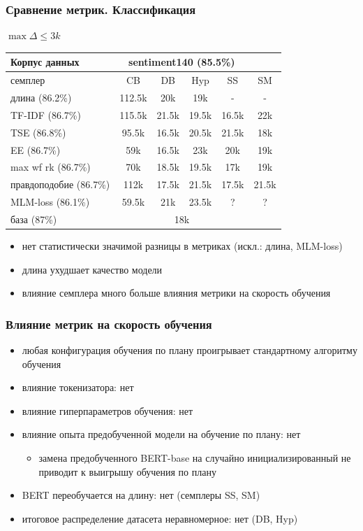 \documentclass{beamer}
\begin{document}
\begin{frame}
	\frametitle{Сравнение метрик. Классификация}
	$\max\Delta \le 3k$
	\begin{table}
		\begin{tabular}{l|ccccc}
			Корпус данных & \multicolumn{4}{c}{sentiment140 (85.5\%)}\\
			\hline
			семплер & CB & DB & Hyp & SS & SM\\
			\hline
			длина (86.2\%) & 112.5k & 20k & 19k & - & -\\
			TF-IDF (86.7\%) & 115.5k & 21.5k & 19.5k & 16.5k & 22k\\
			TSE (86.8\%) & 95.5k & 16.5k & 20.5k & 21.5k & 18k\\
			EE (86.7\%) & 59k & 16.5k & 23k & 20k & 19k\\
			max wf rk (86.7\%) & 70k & 18.5k & 19.5k & 17k & 19k\\
			правдоподобие (86.7\%) & 112k & 17.5k & 21.5k & 17.5k & 21.5k\\
			MLM-loss (86.1\%) & 59.5k & 21k & 23.5k & ? & ?\\
			\hline
			база (87\%) & \multicolumn{4}{c}{18k}
		\end{tabular}
	\end{table}
	\begin{itemize}
		\item нет статистически значимой разницы в метриках (искл.: длина, MLM-loss)
		\item длина ухудшает качество модели
		\item влияние семплера много больше влияния метрики на скорость обучения
	\end{itemize}
\end{frame}

\begin{frame}
	\frametitle{Влияние метрик на скорость обучения}
	\begin{itemize}
		\item любая конфигурация обучения по плану проигрывает стандартному алгоритму обучения
		\item влияние токенизатора: нет
		\item влияние гиперпараметров обучения: нет
		\item влияние опыта предобученной модели на обучение по плану: нет
		\begin{itemize}
			\item замена предобученного BERT-base на случайно инициализированный не приводит к выигрышу обучения по плану
		\end{itemize}
		\item BERT переобучается на длину: нет (семплеры SS, SM)
		\item итоговое распределение датасета неравномерное: нет (DB, Hyp)
	\end{itemize}
\end{frame}
\end{document}
